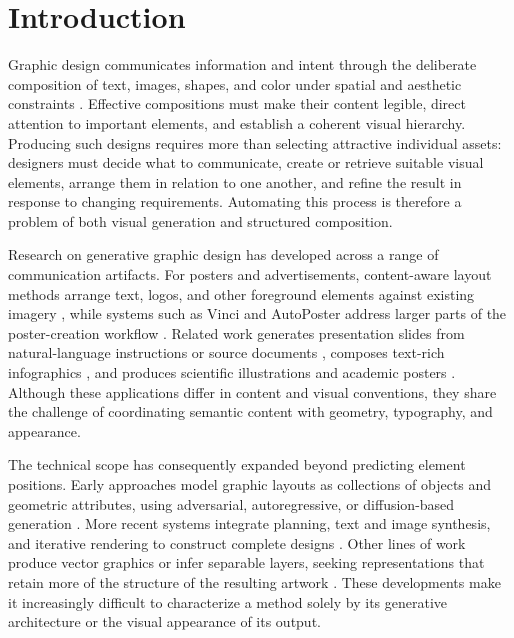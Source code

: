 \section{Introduction}
\label{sec:introduction}

Graphic design communicates information and intent through the deliberate composition of text, images, shapes, and color under spatial and aesthetic constraints \citep{huang2023survey,zou2025fragment}. Effective compositions must make their content legible, direct attention to important elements, and establish a coherent visual hierarchy. Producing such designs requires more than selecting attractive individual assets: designers must decide what to communicate, create or retrieve suitable visual elements, arrange them in relation to one another, and refine the result in response to changing requirements. Automating this process is therefore a problem of both visual generation and structured composition.

Research on generative graphic design has developed across a range of communication artifacts. For posters and advertisements, content-aware layout methods arrange text, logos, and other foreground elements against existing imagery \citep{posterlayout2023,cglgan2022,layoutdetr2024}, while systems such as Vinci and AutoPoster address larger parts of the poster-creation workflow \citep{vinci2021,autoposter2023}. Related work generates presentation slides from natural-language instructions or source documents \citep{autopresent2025,pptagent2025}, composes text-rich infographics \citep{bizgen2025}, and produces scientific illustrations and academic posters \citep{autofigure2026,postergen2026}. Although these applications differ in content and visual conventions, they share the challenge of coordinating semantic content with geometry, typography, and appearance.

The technical scope has consequently expanded beyond predicting element positions. Early approaches model graphic layouts as collections of objects and geometric attributes, using adversarial, autoregressive, or diffusion-based generation \citep{layoutgan2019,layoutdm2023,layoutdiffusion2023}. More recent systems integrate planning, text and image synthesis, and iterative rendering to construct complete designs \citep{cole2023,opencole2024,designascode2026}. Other lines of work produce vector graphics or infer separable layers, seeking representations that retain more of the structure of the resulting artwork \citep{vectorfusion2023,iconshop2023,layerd2025}. These developments make it increasingly difficult to characterize a method solely by its generative architecture or the visual appearance of its output.

